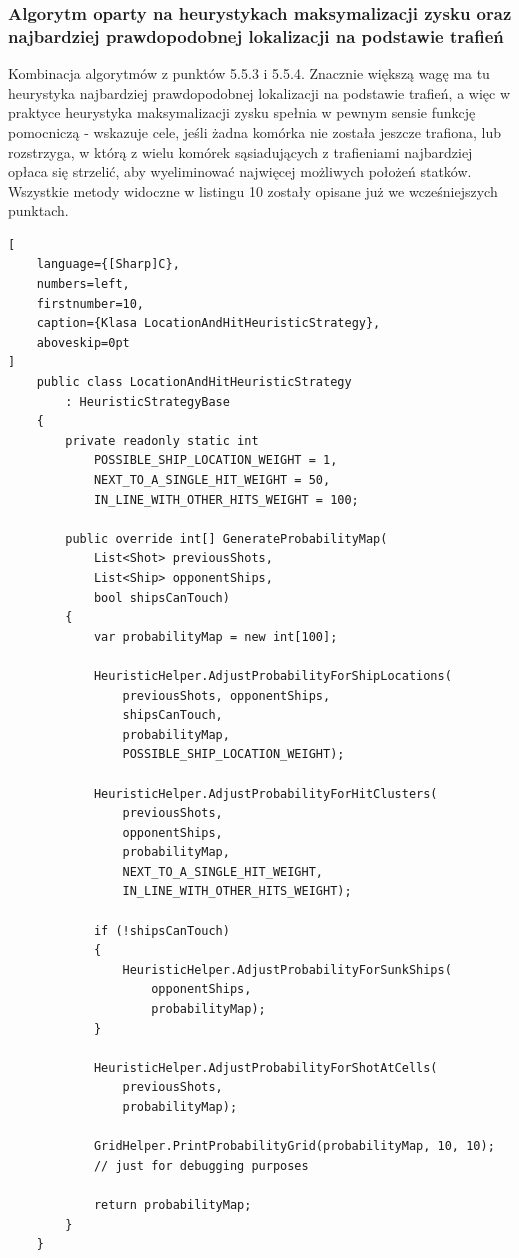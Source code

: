 \subsubsection{Algorytm oparty na heurystykach maksymalizacji zysku oraz najbardziej prawdopodobnej lokalizacji na podstawie trafień}
Kombinacja algorytmów z punktów 5.5.3 i 5.5.4. Znacznie większą wagę ma tu heurystyka najbardziej prawdopodobnej lokalizacji na podstawie trafień, a więc w praktyce heurystyka maksymalizacji zysku spełnia w pewnym sensie funkcję pomocniczą - wskazuje cele, jeśli żadna komórka nie została jeszcze trafiona, lub rozstrzyga, w którą z wielu komórek sąsiadujących z trafieniami najbardziej opłaca się strzelić, aby wyeliminować najwięcej możliwych położeń statków. Wszystkie metody widoczne w listingu 10 zostały opisane już we wcześniejszych punktach.

\begin{addmargin}[10mm]{0mm}
\begin{lstlisting}[
    language={[Sharp]C},
    numbers=left,
    firstnumber=10,
    caption={Klasa LocationAndHitHeuristicStrategy},
    aboveskip=0pt
]
    public class LocationAndHitHeuristicStrategy
        : HeuristicStrategyBase
    {
        private readonly static int
            POSSIBLE_SHIP_LOCATION_WEIGHT = 1,
            NEXT_TO_A_SINGLE_HIT_WEIGHT = 50,
            IN_LINE_WITH_OTHER_HITS_WEIGHT = 100;

        public override int[] GenerateProbabilityMap(
            List<Shot> previousShots,
            List<Ship> opponentShips,
            bool shipsCanTouch)
        {
            var probabilityMap = new int[100];

            HeuristicHelper.AdjustProbabilityForShipLocations(
                previousShots, opponentShips,
                shipsCanTouch,
                probabilityMap,
                POSSIBLE_SHIP_LOCATION_WEIGHT);

            HeuristicHelper.AdjustProbabilityForHitClusters(
                previousShots,
                opponentShips,
                probabilityMap,
                NEXT_TO_A_SINGLE_HIT_WEIGHT,
                IN_LINE_WITH_OTHER_HITS_WEIGHT);

            if (!shipsCanTouch)
            {
                HeuristicHelper.AdjustProbabilityForSunkShips(
                    opponentShips,
                    probabilityMap);
            }

            HeuristicHelper.AdjustProbabilityForShotAtCells(
                previousShots,
                probabilityMap);

            GridHelper.PrintProbabilityGrid(probabilityMap, 10, 10);
            // just for debugging purposes

            return probabilityMap;
        }
    }
\end{lstlisting}
\end{addmargin}

